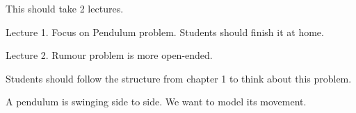 \begin{lesson}

%	
%
%	

\end{lesson}






\begin{annotation}
	\begin{goals}
		This should take 2 lectures.
		
		Lecture 1. Focus on Pendulum problem. Students should finish it at home.
		
		
		Lecture 2. Rumour problem is more open-ended. 
		
		Students should follow the structure from chapter 1 to think about this problem.
	\end{goals}
\end{annotation}
		
		
		
\question \label{pendulum}
	A pendulum is swinging side to side. We want to model its movement.


